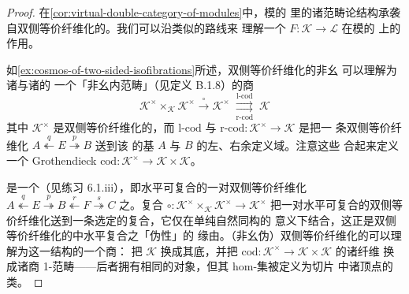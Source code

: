 \begin{proof}
在\cref{cor:virtual-double-category-of-modules}中，模的\trVirtualDoubleCategory{}%
里的诸范畴论结构承袭自双侧等价纤维化的\trDoubleCategory。我们可以沿类似的路线来
理解一个\trCosmologicalFunctor{} $F\colon\mathcal{K}\to\mathcal{L}$ 在模的%
\trVirtualDoubleCategory{}上的作用。

如\cref{ex:cosmos-of-two-sided-isofibrations}所述，双侧等价纤维化的非幺%
\trDoubleCategory{}可以理解为诸\trInfinityCosmos{}与诸\trCosmologicalFunctor{}的
一个「非幺内范畴」（见定义 B.1.8）的商
\begin{equation*}
\mathcal{K}^{\times}\times_{\mathcal{K}}\mathcal{K}^{\times}
\xrightarrow{\ \circ\ }
\mathcal{K}^{\times}
\;\overset{\text{l-cod}}{\underset{\text{r-cod}}{\rightrightarrows}}\;
\mathcal{K}
\end{equation*}
其中 $\mathcal{K}^{\times}$ 是双侧等价纤维化的\trInfinityCosmos，而
$\text{l-cod}$ 与 $\text{r-cod}\colon\mathcal{K}^{\times}\to\mathcal{K}$ 是把一
条双侧等价纤维化
$A\overset{q}{\twoheadleftarrow}E\overset{p}{\twoheadrightarrow}B$ 送到该\trSpan{}%
的基\trInfinityCategory{} $A$ 与 $B$ 的左、右余定义域\trFunctor。注意这些%
\trFunctor{}合起来定义一个 Grothendieck \trFibration{}
$\mathrm{cod}\colon\mathcal{K}^{\times}\to\mathcal{K}\times\mathcal{K}$。\trPullback
\begin{center}
\end{center}
是一个\trInfinityCosmos{}（见练习 6.1.iii），即水平可复合的一对双侧等价纤维化
$A\overset{q}{\twoheadleftarrow}E\overset{p}{\twoheadrightarrow}B\overset{r}{\twoheadleftarrow}F\overset{s}{\twoheadrightarrow}C$
之\trInfinityCosmos。复合\trFunctor{}
$\circ\colon\mathcal{K}^{\times}\times_{\mathcal{K}}\mathcal{K}^{\times}\to\mathcal{K}^{\times}$
把一对水平可复合的双侧等价纤维化送到一条选定的复合\trSpan，它仅在单纯自然同构的
意义下结合，这正是双侧等价纤维化的\trDoubleCategory{}中水平复合之「伪性」的
缘由。（非幺伪）双侧等价纤维化的\trDoubleCategory{}可以理解为这一结构的一个商：
把\trInfinityCosmos{} $\mathcal{K}$ 换成其底\trCategory，并把
$\mathrm{cod}\colon\mathcal{K}^{\times}\to\mathcal{K}\times\mathcal{K}$ 的诸纤维
换成诸商 1-范畴——后者拥有相同的对象，但其 hom-集被定义为切片\trFunctorSpace{}%
中诸顶点的\trIsomorphism{}类。


\end{proof}
